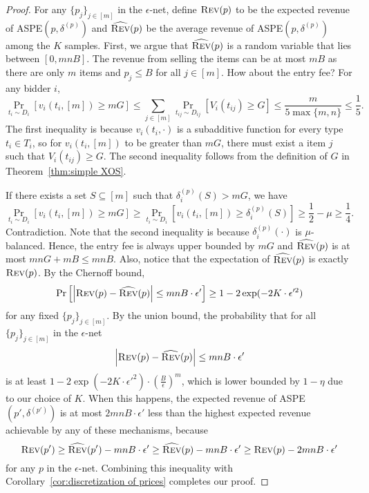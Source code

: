 \begin{proof}
	For any $\{p_j\}_{j\in[m]}$ in the $\epsilon$-net, define $\textsc{Rev}(p)$ to be the expected revenue of ASPE$(p,\delta^{(p)})$ and  $\widehat{\textsc{Rev}}(p)$ be the average revenue of ASPE$(p,\delta^{(p)})$ among the $K$ samples. First, we argue that $\widehat{\textsc{Rev}}(p)$ is a random variable that lies between $[0,mnB]$. The revenue from selling the items can be at most $mB$ as there are only $m$ items and $p_j\leq B$ for all $j\in[m]$. How about the entry fee? 
	For any bidder $i$, $$\Pr_{t_i\sim D_i}\left[v_i(t_i,[m])\geq mG\right]\leq \sum_{j\in[m]} \Pr_{t_{ij}\sim D_{ij}}\left[V_i(t_{ij})\geq G\right]\leq \frac{m}{5\max\{m,n\}}\leq\frac{1}{5}.$$ The first inequality is because $v_i(t_i,\cdot)$ is a subadditive function for every type $t_i\in T_i$, so for $v_i(t_i,[m])$ to be greater than $mG$, there must exist a item $j$ such that $V_i(t_{ij})\geq G$. The second inequality follows from the definition of $G$ in Theorem~\ref{thm:simple XOS}.
	
	 If there exists a set $S\subseteq[m]$ such that $\delta_i^{(p)}(S)> mG$, we have $$\Pr_{t_i\sim D_i}\left[v_i(t_i,[m])\geq mG\right]\geq \Pr_{t_i\sim D_i}\left[v_i(t_i,[m])\geq \delta_i^{(p)}(S)\right]\geq %
	  \frac{1}{2}-\mu\geq \frac{1}{4}.$$ Contradiction. Note that the second inequality is because $\delta_i^{(p)}(\cdot)$ is $\mu$-balanced. Hence, the entry fee is always upper bounded by $mG$ and $\widehat{\textsc{Rev}}(p)$ is at most $mnG+mB\leq mnB$. Also, notice that the expectation of $\widehat{\textsc{Rev}}(p)$ is exactly $\textsc{Rev}(p)$. 
	  By the Chernoff bound, $$\Pr\left[\left|\textsc{Rev}(p)-\widehat{\textsc{Rev}}(p)\right|\leq mnB\cdot \epsilon'\right]\geq 1-2\exp(-2K\cdot \epsilon'^2)$$ for any fixed $\{p_j\}_{j\in[m]}$. By the union bound, the probability that for all $\{p_j\}_{j\in[m]}$ in the $\epsilon$-net $$\left|\textsc{Rev}(p)-\widehat{\textsc{Rev}}(p)\right| \leq mnB\cdot \epsilon'$$ is at least $1-2\exp(-2K\cdot \epsilon'^2)\cdot \left(\frac{B}{\epsilon}\right)^m$, which is lower bounded by $1-\eta$ due to our choice of $K$. 
When this happens, the expected revenue of ASPE$(p',\delta^{(p')})$ is at most $2mnB\cdot \epsilon'$ less than the highest expected revenue achievable by any of these mechanisms, because 
$$\textsc{Rev}(p')\geq \widehat{\textsc{Rev}}(p')-mnB\cdot \epsilon' \geq \widehat{\textsc{Rev}}(p)-mnB\cdot \epsilon'\geq \textsc{Rev}(p)-2mnB\cdot \epsilon'$$ for any $p$ in the $\epsilon$-net. Combining this inequality with Corollary~\ref{cor:discretization of prices} completes our proof.
\end{proof}

